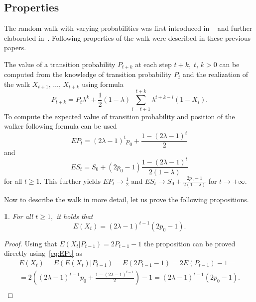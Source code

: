 \documentclass{amsart}
\theoremstyle{definition}
\theoremstyle{plain}
\newtheorem{prop}[thm]{\protect\propositionname}
\theoremstyle{plain}
\theoremstyle{plain}
\numberwithin{equation}{section}
\providecommand{\propositionname}{Proposition}
\begin{document}
    \subsection{Properties}\label{subsec:properties}

    The random walk with varying probabilities was first introduced in
    ~\cite{ja2017ddny} and further elaborated in~\cite{ja2019teze}.
    Following properties of the walk were described in these previous
    papers.

    The value of a transition probability $P_{t+k}$ at
    each step $t+k,\;t,\,k>0$ can be computed from the knowledge of
    transition probability $P_{t}$ and the realization of the walk
    $X_{t+1},\,\dots,\,X_{t+k}$ using formula
    \begin{equation}
        P_{t+k}=P_{t}\lambda^{k}+\frac{1}{2}(1-\lambda)\sum_{i=t+1}^{t+k}\lambda^{t+k-i}(1-X_{i}).\label{eq:Pt}
    \end{equation}
    To compute the expected value of transition probability and position of the walker following formula can be used
    \begin{equation}
        EP_{t}=(2\lambda-1)^{t}p_{0}+\frac{1-(2\lambda-1)^{t}}{2}\label{eq:EPt}
    \end{equation}
    and
    \begin{equation}
        ES_{t}=S_{0}+(2p_{0}-1)\frac{1-(2\lambda-1)^{t}}{2(1-\lambda)}\label{eq:ESt}
    \end{equation}
    for all $t\geq1$.
    This further yields $EP_{t}\rightarrow\frac{1}{2}$
    and $ES_{t}\rightarrow S_{0}+\frac{2p_{0}-1}{2(1-\lambda)}$ for $t\rightarrow+\infty$.

    Now to describe the walk in more detail, let us
    prove the following propositions.

    \begin{prop}
        \label{PropEXt-succes}
        For all $t\geq1,$ it holds that
        \begin{equation}
            E(X_{t})=(2\lambda-1)^{t-1}(2p_{0}-1).
        \end{equation}
    \end{prop}
    \begin{proof}
        Using that $E(X_{t}|P_{t-1})=2P_{t-1}-1$ the proposition can be
        proved directly using~\eqref{eq:EPt} as
        \begin{gather*}
            E(X_{t})=E(E(X_{t})|P_{t-1})=E(2P_{t-1}-1)=2E(P_{t-1})-1=\\
            =2((2\lambda-1)^{t-1}p_{0}+\frac{1-(2\lambda-1)^{t-1}}{2})-1=(2\lambda-1)^{t-1}(2p_{0}-1).\\
        \end{gather*}
    \end{proof}
\end{document}
